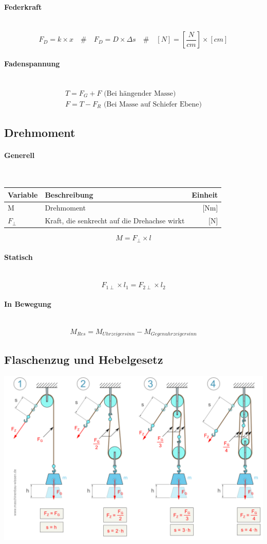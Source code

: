 \documentclass[a4paper,10pt]{article}
\newcommand{\lbparagraph}[1]{\paragraph{#1}\mbox{}\\}
\newcommand{\eqsp}[1]{\quad\#\quad}
\begin{document}
\lbparagraph{Federkraft}

\begin{equation}
    F_D = k \times x
    \eqsp{}
    F_D = D \times \Delta{s}
    \eqsp{}
    [N] = [\frac{N}{cm}] \times [cm]
\end{equation}

\lbparagraph{Fadenspannung}

\begin{gather}
    T = F_G + F \text{ (Bei hängender Masse)}
    \\
    F = T - F_R \text{ (Bei Masse auf Schiefer Ebene)}
\end{gather}

\subsection{Drehmoment}

\lbparagraph{Generell}

\begin{tabular}{l|l|r}
    Variable & Beschreibung & Einheit \\
    \hline
    M & Drehmoment & [Nm] \\
    $F_{\perp}$ & Kraft, die senkrecht auf die Drehachse wirkt & [N]
\end{tabular}

\begin{equation}
    M = F_{\perp} \times l
\end{equation}

\lbparagraph{Statisch}

\begin{equation}
    F_{1\perp} \times l_1 = F_{2\perp} \times l_2
\end{equation}

\lbparagraph{In Bewegung}

\begin{equation}
    M_{Res} = M_{Uhrzeigersinn} - M_{Gegenuhrzeigersinn}
\end{equation}

\subsection{Flaschenzug und Hebelgesetz}

\includegraphics[width=\textwidth,height=\textheight,keepaspectratio]{flaschenzug-berechnen}
\end{document}
